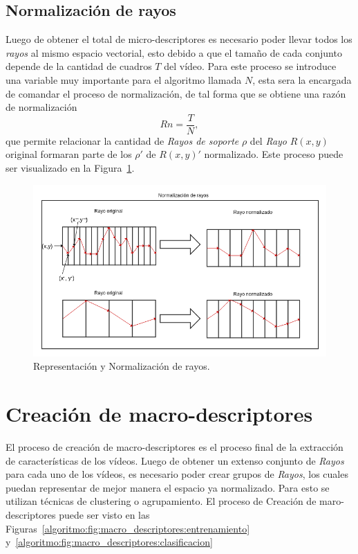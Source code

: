 	\subsection{Normalización de rayos}
	\label{algoritmo:normalizacion}
	Luego de obtener el total de micro-descriptores es necesario poder llevar todos los \textit{rayos} al mismo espacio vectorial, esto debido a que el tamaño de cada conjunto depende de la cantidad de cuadros $T$ del vídeo. Para este proceso se introduce una variable muy importante para el algoritmo llamada $N$, esta sera la encargada de comandar el proceso de normalización, de tal forma que se obtiene una razón de normalización
	\begin{equation}
		Rn = \frac{T}{N},
	\end{equation}
	que permite relacionar la cantidad de \textit{Rayos de soporte} $\rho$ del \textit{Rayo} $R(x,y)$ original formaran parte de los $\rho'$ de $R(x,y)'$ normalizado. Este proceso puede ser visualizado en la Figura~\ref{algoritmo:fig:normalizacion}.
	
	\begin{figure}[bt]
		\centering
    		\includegraphics[width=1\textwidth]{Figuras/Diagramas/normalizacion_de_rayos.png}
  		\caption{Representación y Normalización de rayos.}
  		\label{algoritmo:fig:normalizacion}
	\end{figure}	

	
\newpage	
\section{Creación de macro-descriptores}
\label{sec:macro-descriptores}
El proceso de creación de macro-descriptores es el proceso final de la extracción de características de los vídeos. Luego de obtener un extenso conjunto de \textit{Rayos} para cada uno de los vídeos, es necesario poder crear grupos de \textit{Rayos}, los cuales puedan representar de mejor manera el espacio ya normalizado. Para esto se utilizan técnicas de clustering o agrupamiento. El proceso de Creación de maro-descriptores puede ser visto en las Figuras~\ref{algoritmo:fig:macro_descriptores:entrenamiento} y~\ref{algoritmo:fig:macro_descriptores:clasificacion}

